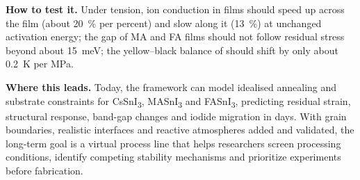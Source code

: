 \begin{tcolorbox}[colback=boxbg, colframe=boxframe, boxrule=0.8pt, arc=2pt, left=8pt, right=8pt, top=6pt, bottom=6pt,
  title={\textbf{At a glance}}, fonttitle=\large, coltitle=white]
\textbf{How to test it.} Under tension, ion conduction in \CsSnI{} films should speed up across the film (about
\SI{20}{\percent} per percent) and slow along it (\SI{13}{\percent}) at unchanged activation energy; the gap of MA and FA films should not follow residual stress beyond about
\SI{15}{meV}; the yellow--black balance of \CsSnI{} should shift by only about \SI{0.2}{K} per MPa.

\textbf{Where this leads.} Today, the framework can model idealised annealing and substrate constraints for CsSnI\textsubscript{3}, MASnI\textsubscript{3} and FASnI\textsubscript{3}, predicting residual strain, structural response, band-gap changes and iodide migration in days. With grain boundaries, realistic interfaces and reactive atmospheres added and validated, the long-term goal is a virtual process line that helps researchers screen processing conditions, identify competing stability mechanisms and prioritize experiments before fabrication.
\end{tcolorbox}
